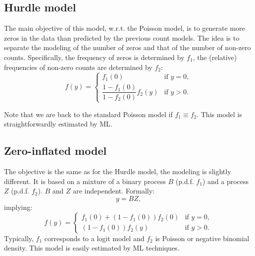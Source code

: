 \documentclass[
  12pt,
]{book}
\theoremstyle{definition}
\theoremstyle{definition}
\theoremstyle{definition}
\theoremstyle{definition}
\theoremstyle{remark}
\begin{document}
\hypertarget{hurdle-model}{%
\subsection{Hurdle model}\label{hurdle-model}}

The main objective of this model, w.r.t. the Poisson model, is to generate more zeros in the data than predicted by the previous count models. The idea is to separate the modeling of the number of zeros and that of the number of non-zero counts. Specifically, the frequency of zeros is determined by \(f_1\), the (relative) frequencies of non-zero counts are determined by \(f_2\):
\[
f(y) = \left\{
\begin{array}{lll}
f_1(0) & \mbox{if $y=0$},\\
\dfrac{1-f_1(0)}{1-f_2(0)}f_2(y) & \mbox{if $y>0$}.
\end{array}
\right.
\]

Note that we are back to the standard Poisson model if \(f_1 \equiv f_2\). This model is straightforwardly estimated by ML.

\hypertarget{zero-inflated-model}{%
\subsection{Zero-inflated model}\label{zero-inflated-model}}

The objective is the same as for the Hurdle model, the modeling is slightly different. It is based on a mixture of a binary process \(B\) (p.d.f. \(f_1\)) and a process \(Z\) (p.d.f. \(f_2\)). \(B\) and \(Z\) are independent. Formally:
\[
y = B Z,
\]
implying:
\[
f(y) = \left\{
\begin{array}{lll}
f_1(0) + (1-f_1(0))f_2(0) & \mbox{if $y=0$},\\
(1-f_1(0))f_2(y) & \mbox{if $y>0$}.
\end{array}
\right.
\]
Typically, \(f_1\) corresponds to a logit model and \(f_2\) is Poisson or negative binomial density. This model is easily estimated by ML techniques.
\end{document}
